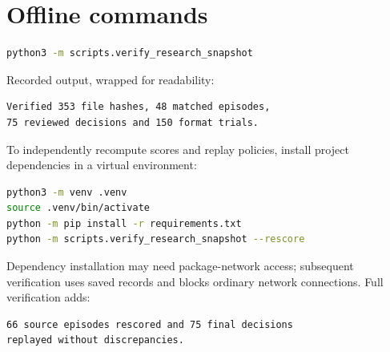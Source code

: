 \section{Offline commands}
\begin{lstlisting}[language=bash,caption={Reconstruct saved tables without model requests.}]
python3 -m scripts.verify_research_snapshot
\end{lstlisting}
Recorded output, wrapped for readability:
\begin{lstlisting}
Verified 353 file hashes, 48 matched episodes,
75 reviewed decisions and 150 format trials.
\end{lstlisting}
To independently recompute scores and replay policies, install project dependencies in a virtual environment:
\begin{lstlisting}[language=bash]
python3 -m venv .venv
source .venv/bin/activate
python -m pip install -r requirements.txt
python -m scripts.verify_research_snapshot --rescore
\end{lstlisting}
Dependency installation may need package-network access; subsequent verification uses saved records and blocks ordinary network connections. Full verification adds:
\begin{lstlisting}
66 source episodes rescored and 75 final decisions
replayed without discrepancies.
\end{lstlisting}

\clearpage
